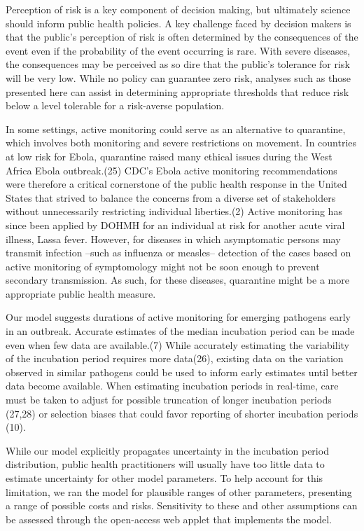 \documentclass[]{article}
\begin{document}
Perception of risk is a key component of decision making, but ultimately
science should inform public health policies. A key challenge faced by
decision makers is that the public's perception of risk is often
determined by the consequences of the event even if the probability of
the event occurring is rare. With severe diseases, the consequences may
be perceived as so dire that the public's tolerance for risk will be
very low. While no policy can guarantee zero risk, analyses such as
those presented here can assist in determining appropriate thresholds
that reduce risk below a level tolerable for a risk-averse population.

In some settings, active monitoring could serve as an alternative to
quarantine, which involves both monitoring and severe restrictions on
movement. In countries at low risk for Ebola, quarantine raised many
ethical issues during the West Africa Ebola outbreak.(25) CDC's Ebola
active monitoring recommendations were therefore a critical cornerstone
of the public health response in the United States that strived to
balance the concerns from a diverse set of stakeholders without
unnecessarily restricting individual liberties.(2) Active monitoring has
since been applied by DOHMH for an individual at risk for another acute
viral illness, Lassa fever. However, for diseases in which asymptomatic
persons may transmit infection --such as influenza or measles--
detection of the cases based on active monitoring of symptomology might
not be soon enough to prevent secondary transmission. As such, for these
diseases, quarantine might be a more appropriate public health measure.

Our model suggests durations of active monitoring for emerging pathogens
early in an outbreak. Accurate estimates of the median incubation period
can be made even when few data are available.(7) While accurately
estimating the variability of the incubation period requires more
data(26), existing data on the variation observed in similar pathogens
could be used to inform early estimates until better data become
available. When estimating incubation periods in real-time, care must be
taken to adjust for possible truncation of longer incubation periods
(27,28) or selection biases that could favor reporting of shorter
incubation periods (10).

While our model explicitly propagates uncertainty in the incubation
period distribution, public health practitioners will usually have too
little data to estimate uncertainty for other model parameters. To help
account for this limitation, we ran the model for plausible ranges of
other parameters, presenting a range of possible costs and risks.
Sensitivity to these and other assumptions can be assessed through the
open-access web applet that implements the model.
\end{document}
